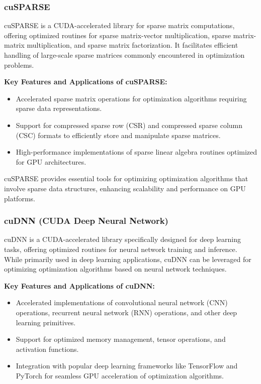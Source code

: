 \documentclass[11pt]{report}
\begin{document}
        \subsubsection{cuSPARSE}
        cuSPARSE is a CUDA-accelerated library for sparse matrix computations, offering optimized routines for sparse matrix-vector multiplication, sparse matrix-matrix multiplication, and sparse matrix factorization. It facilitates efficient handling of large-scale sparse matrices commonly encountered in optimization problems.
        
        \textbf{Key Features and Applications of cuSPARSE:}
        \begin{itemize}
            \item Accelerated sparse matrix operations for optimization algorithms requiring sparse data representations.
        
            \item Support for compressed sparse row (CSR) and compressed sparse column (CSC) formats to efficiently store and manipulate sparse matrices.
        
            \item High-performance implementations of sparse linear algebra routines optimized for GPU architectures.
        \end{itemize}
        
        cuSPARSE provides essential tools for optimizing optimization algorithms that involve sparse data structures, enhancing scalability and performance on GPU platforms.
        
        \subsubsection{cuDNN (CUDA Deep Neural Network)}
        cuDNN is a CUDA-accelerated library specifically designed for deep learning tasks, offering optimized routines for neural network training and inference. While primarily used in deep learning applications, cuDNN can be leveraged for optimizing optimization algorithms based on neural network techniques.
        
        \textbf{Key Features and Applications of cuDNN:}
        \begin{itemize}
            \item Accelerated implementations of convolutional neural network (CNN) operations, recurrent neural network (RNN) operations, and other deep learning primitives.
        
            \item Support for optimized memory management, tensor operations, and activation functions.
        
            \item Integration with popular deep learning frameworks like TensorFlow and PyTorch for seamless GPU acceleration of optimization algorithms.
        \end{itemize}
        
\end{document}
